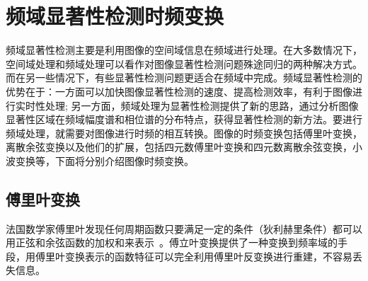 

\section{频域显著性检测时频变换}
\label{2_2}

频域显著性检测主要是利用图像的空间域信息在频域进行处理。在大多数情况下，空间域处理和频域处理可以看作对图像显著性检测问题殊途同归的两种解决方式。而在另一些情况下，有些显著性检测问题更适合在频域中完成。频域显著性检测的优势在于：一方面可以加快图像显著性检测的速度、提高检测效率，有利于图像进行实时性处理; 另一方面，频域处理为显著性检测提供了新的思路，通过分析图像显著性区域在频域幅度谱和相位谱的分布特点，获得显著性检测的新方法。要进行频域处理，就需要对图像进行时频的相互转换。图像的时频变换包括傅里叶变换，离散余弦变换以及他们的扩展，包括四元数傅里叶变换和四元数离散余弦变换，小波变换等，下面将分别介绍图像时频变换。

\subsection{傅里叶变换}
\label{2_2_1}

法国数学家傅里叶发现任何周期函数只要满足一定的条件（狄利赫里条件）都可以用正弦和余弦函数的加权和来表示~\cite{ZhangZheng2010book}。傅立叶变换提供了一种变换到频率域的手段，用傅里叶变换表示的函数特征可以完全利用傅里叶反变换进行重建，不容易丢失信息。

